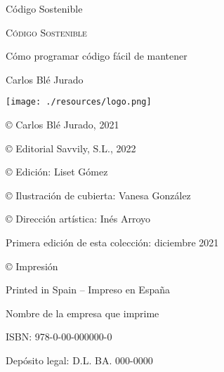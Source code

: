 \documentclass[10pt]{article}
\begin{document}
\newpage\phantom{blabla}\thispagestyle{empty}
\newpage\phantom{blabla}\thispagestyle{empty}
\newpage\phantom{blabla}\thispagestyle{empty}

\begin{titlepage}
  {\large\phantom{blabla} \par}
  \vspace{1cm}
  {\huge\centering Código Sostenible \par}
\end{titlepage}

\newpage\phantom{blabla}\thispagestyle{empty}

\begin{titlepage}\thispagestyle{empty}
  {\large\phantom{blabla} \par}
  \vspace{1cm}
  {\scshape\Huge\centering Código Sostenible \par}
  \vspace{0.5cm}
  {\normalsize\centering Cómo programar código fácil de mantener \par}
  \vspace{1cm}
  {\large\centering Carlos Blé Jurado \par}
  \vspace{8.5cm}
  \begin{center}
    {\texttt{[image: ./resources/logo.png]}}
  \end{center}
\end{titlepage}

\begin{titlepage}\thispagestyle{empty}
  \vspace*{\fill}
  {\normalsize © Carlos Blé Jurado, 2021 \par}
  {\normalsize © Editorial Savvily, S.L., 2022 \par}
  {\normalsize © Edición: Liset Gómez \par}
  {\normalsize © Ilustración de cubierta: Vanesa González \par}
  {\normalsize © Dirección artística: Inés Arroyo \par}
  {\normalsize Primera edición de esta colección: diciembre 2021 \par}
  {\normalsize © Impresión \par}
  {\normalsize Printed in Spain – Impreso en España \par}
  {\normalsize Nombre de la empresa que imprime \par}
  {\normalsize ISBN: 978-0-00-000000-0 \par}
  {\normalsize Depósito legal: D.L. BA. 000-0000 \par}
\end{titlepage}
\end{document}
